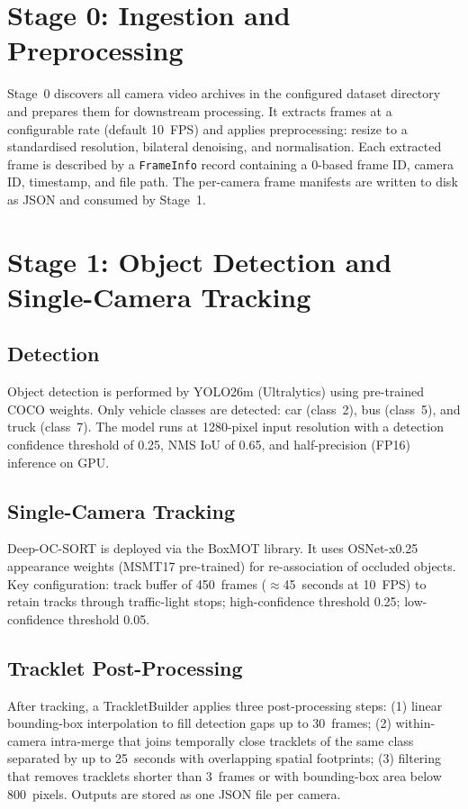\section{Stage 0: Ingestion and Preprocessing}

Stage~0 discovers all camera video archives in the configured dataset directory and prepares them for downstream processing. It extracts frames at a configurable rate (default 10~FPS) and applies preprocessing: resize to a standardised resolution, bilateral denoising, and normalisation. Each extracted frame is described by a \texttt{FrameInfo} record containing a 0-based frame ID, camera ID, timestamp, and file path. The per-camera frame manifests are written to disk as JSON and consumed by Stage~1.

\section{Stage 1: Object Detection and Single-Camera Tracking}

\subsection{Detection}

Object detection is performed by YOLO26m (Ultralytics) using pre-trained COCO weights. Only vehicle classes are detected: car (class~2), bus (class~5), and truck (class~7). The model runs at 1280-pixel input resolution with a detection confidence threshold of 0.25, NMS IoU of 0.65, and half-precision (FP16) inference on GPU.

\subsection{Single-Camera Tracking}

Deep-OC-SORT is deployed via the BoxMOT library. It uses OSNet-x0.25 appearance weights (MSMT17 pre-trained) for re-association of occluded objects. Key configuration: track buffer of 450~frames ($\approx$45~seconds at 10~FPS) to retain tracks through traffic-light stops; high-confidence threshold 0.25; low-confidence threshold 0.05.

\subsection{Tracklet Post-Processing}

After tracking, a TrackletBuilder applies three post-processing steps: (1) linear bounding-box interpolation to fill detection gaps up to 30~frames; (2) within-camera intra-merge that joins temporally close tracklets of the same class separated by up to 25~seconds with overlapping spatial footprints; (3) filtering that removes tracklets shorter than 3~frames or with bounding-box area below 800~pixels. Outputs are stored as one JSON file per camera.

